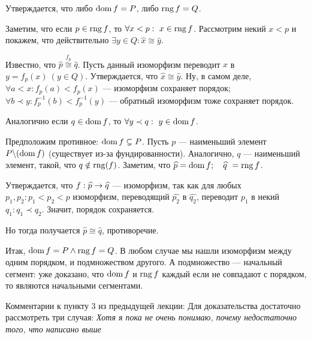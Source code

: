 \documentclass[a4paper]{report}
\begin{document}
{{{            \item Утверждается, что либо $\operatorname{dom} f = P$, либо $\operatorname{rng} f = Q$.

            \item Заметим, что если $p \in \operatorname{rng} f$, то $\forall x < p : ~x \in \operatorname{rng} f$. Рассмотрим некий $x < p$ и покажем, что действительно $\exists y \in Q : \hat{x} \cong \hat{y}$.

            Известно, что $\hat{p} \overset{f_p}{\cong} \hat{q}$. Пусть данный изоморфизм переводит $x$ в $y = f_p(x)~ (y \in Q)$. Утверждается, что $\hat{x} \cong \hat{y}$. Ну, в самом деле, $\forall a < x: f_p(a) < f_p(x)$ --- изоморфизм сохраняет порядок; $\forall b \prec y : f_p^{-1}(b) < f_p^{-1}(y)$ --- обратный изоморфизм тоже сохраняет порядок.

            \item Аналогично если $q \in \operatorname{dom} f$, то $\forall y \prec q : ~ y \in \operatorname{dom} f$.

            \item Предположим противное: $\operatorname{dom} f \subsetneq P$. Пусть $p$ --- наименьший элемент $P\backslash(\operatorname{dom} f)$ (существует из-за фундированности). Аналогично, $q$ --- наименьший элемент, такой, что $q \notin \operatorname{rng}(f)$. Заметим, что $\widehat{p} = \operatorname{dom} f; \quad \widehat{q}~ = \operatorname{rng} f$.

            Утверждается, что $f : \widehat{p} \rightarrow \widehat{q}$ --- изоморфизм, так как для любых $p_1, p_2: {p_1 < p_2 < p}$ изоморфизм, переводящий $\hat{p_2}$ в $\hat{q_2}$, переводит $p_1$ в некий $q_1:q_1 \prec q_2$. Значит, порядок сохраняется.

            Но тогда получается $\hat{p} \cong \hat{q}$, противоречие.

            \item Итак, $\operatorname{dom} f = P \land \operatorname{rng} f = Q$. В любом случае мы нашли изоморфизм между одним порядком, и подмножеством другого. А подмножество --- начальный сегмент: уже доказано, что $\operatorname{dom} f$ и $\operatorname{rng} f$ каждый если не совпадают с порядком, то являются начальными сегментами.
            }
        }
    }
    Комментарии к пункту 3 из предыдущей лекции:
    Для доказательства достаточно рассмотреть три случая: \emph{Хотя я пока не очень понимаю, почему недостаточно того, что написано выше}
\end{document}
